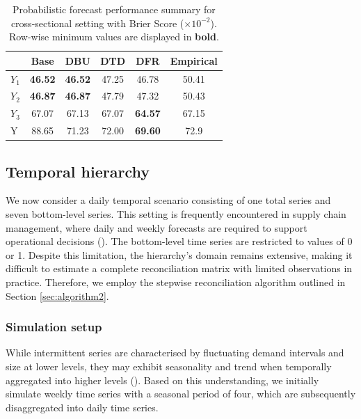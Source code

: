 \documentclass[a4paper,review,12pt,authoryear]{elsarticle}
\theoremstyle{definition}
\begin{document}
    \begin{table}
      \centering
      \caption{\label{tab:sim_crosssectional_res_dist} Probabilistic forecast performance summary for cross-sectional setting with Brier Score ($\times 10^{-2}$). Row-wise minimum values are displayed in \textbf{bold}.}
      \begin{tabular}{lccccc}
      \toprule
      ~ & Base & DBU & DTD & DFR & Empirical \\ \midrule
      $Y_1$ & \textbf{46.52} & \textbf{46.52} & 47.25 & 46.78 & 50.41 \\ 
      $Y_2$ & \textbf{46.87} & \textbf{46.87} & 47.79 & 47.32 & 50.43 \\ 
      $Y_3$ & 67.07 & 67.13 & 67.07 & \textbf{64.57} & 67.15 \\ 
      Y & 88.65 & 71.23 & 72.00 & \textbf{69.60} & 72.9 \\ 
      \bottomrule
      \end{tabular}
    \end{table}


     \subsection{Temporal hierarchy}\label{sec:temporal_simu}
     We now consider a daily temporal scenario consisting of one total series and seven bottom-level series.
     This setting is frequently encountered in supply chain management, where daily and weekly forecasts are required to support operational decisions (\citealp{syntetosSupplyChainForecasting2016}).
     The bottom-level time series are restricted to values of 0 or 1.
     Despite this limitation, the hierarchy's domain remains extensive, making it difficult to estimate a complete reconciliation matrix with limited observations in practice.
     Therefore, we employ the stepwise reconciliation algorithm outlined in Section \ref{sec:algorithm2}.

     \subsubsection{Simulation setup}

     While intermittent series are characterised by fluctuating demand intervals and size at lower levels, they may exhibit seasonality and trend when temporally aggregated into higher levels ().
     Based on this understanding, we initially simulate weekly time series with a seasonal period of four, which are subsequently disaggregated into daily time series.
\end{document}

